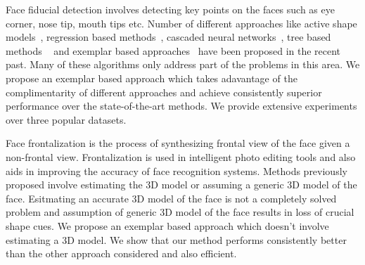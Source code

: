 Face fiducial detection involves detecting key points on the faces such as eye corner, nose tip, mouth tips
etc. Number of different approaches like active shape models~\cite{milborrowCVPR08_ASM}, regression based 
methods~\cite{yuECCV14_CoR}, cascaded neural networks~\cite{zhangECCV14_deepfacealign}, tree based methods
~\cite{xhuCVPR12_wild} and exemplar based approaches~\cite{kumarPAMI13_faceExem} have been proposed in the 
recent past. Many of these algorithms only address part of the problems in this area. We propose an 
exemplar based approach which takes adavantage of the complimentarity of different approaches and achieve
consistently superior performance over the state-of-the-art methods. We provide extensive experiments 
over three popular datasets.

Face frontalization is the process of synthesizing frontal view of the face given a non-frontal view. 
Frontalization is used in intelligent photo editing tools and also aids in improving the accuracy of face
 recognition systems. Methods previously proposed involve estimating the 3D model or assuming a generic
3D model of the face. Esitmating an accurate 3D model of the face is not a completely solved problem and 
assumption of generic 3D model of the face results in loss of crucial shape cues. We propose an exemplar
based approach which doesn't involve estimating a 3D model. We show that our method performs consistently
better than the other approach considered and also efficient.
